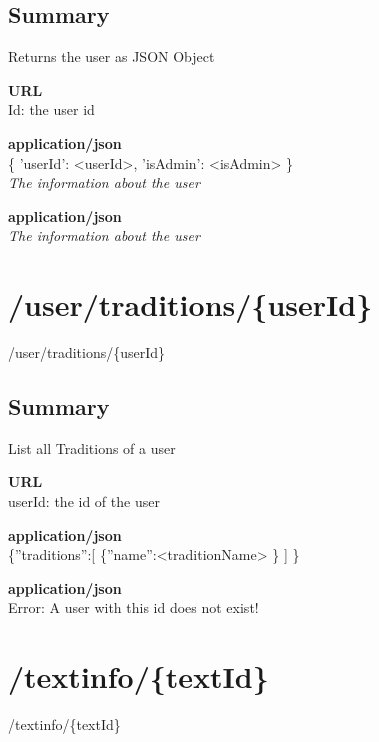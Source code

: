 \documentclass[11pt,fleqn,openany]{book} %
\begin{document}
\subsection*{Summary}
Returns the user as JSON Object
\begin{parameter}\textbf{URL}\\
 Id: the user id
\end{parameter}
\begin{return}[OK]
\textbf{application/json}\\
\{ 'userId': <userId>, 'isAdmin': <isAdmin> \}\\
\textit{The information about the user}
\end{return}
\begin{return}
\textbf{application/json}\\
\textit{The information about the user}
\end{return}

\section{/user/traditions/\{userId\}}
\begin{get}
/user/traditions/\{userId\}
\end{get}

\subsection*{Summary}
List all Traditions of a user
\begin{parameter}\textbf{URL}\\
userId: the id of the user \\
\end{parameter}
\begin{return}[OK]
\textbf{application/json}\\
\{''traditions'':[ \{''name'':<traditionName> \} ] \}
\end{return}
\begin{return}
\textbf{application/json}\\
Error: A user with this id does not exist!
\end{return}

\section{/textinfo/\{textId\}}
\begin{post}
/textinfo/\{textId\}
\end{post}
\end{document}
